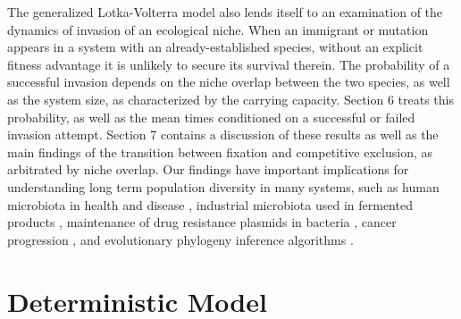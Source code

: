 \documentclass[a4paper,10pt]{article}
\numberwithin{equation}{section} %
\begin{document}
The generalized Lotka-Volterra model also lends itself to an examination of the dynamics of invasion of an ecological niche. 
When an immigrant or mutation appears in a system with an already-established species, without an explicit fitness advantage it is unlikely to secure its survival therein. 
The probability of a successful invasion depends on the niche overlap between the two species, as well as the system size, as characterized by the carrying capacity. 
Section 6 treats this probability, as well as the mean times conditioned on a successful or failed invasion attempt. 
Section 7 contains a discussion of these results as well as the main findings of the transition between fixation and competitive exclusion, as arbitrated by niche overlap. 
Our findings have important implications for understanding long term population diversity in many systems, such as human microbiota in health and disease \cite{Coburn2015,Palmer2001,Kinross2011}, industrial microbiota used in fermented products \cite{Wolfe2014}, maintenance of drug resistance plasmids in bacteria \cite{Gooding-townsend2015}, cancer progression \cite{Ashcroft2015}, and evolutionary phylogeny inference algorithms \cite{Rice2004}. %



\section{Deterministic Model}
\end{document}
